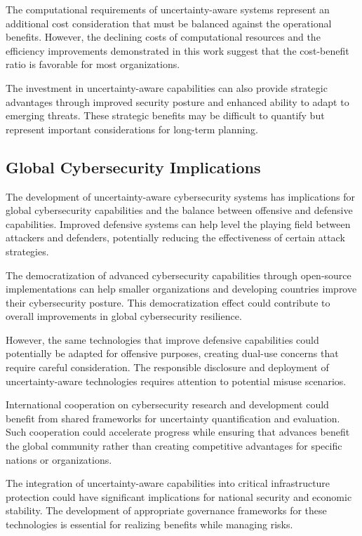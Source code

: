\documentclass[journal]{IEEEtran}
\begin{document}
The computational requirements of uncertainty-aware systems represent an additional cost consideration that must be balanced against the operational benefits. However, the declining costs of computational resources and the efficiency improvements demonstrated in this work suggest that the cost-benefit ratio is favorable for most organizations.

The investment in uncertainty-aware capabilities can also provide strategic advantages through improved security posture and enhanced ability to adapt to emerging threats. These strategic benefits may be difficult to quantify but represent important considerations for long-term planning.

\subsection{Global Cybersecurity Implications}

The development of uncertainty-aware cybersecurity systems has implications for global cybersecurity capabilities and the balance between offensive and defensive capabilities. Improved defensive systems can help level the playing field between attackers and defenders, potentially reducing the effectiveness of certain attack strategies.

The democratization of advanced cybersecurity capabilities through open-source implementations can help smaller organizations and developing countries improve their cybersecurity posture. This democratization effect could contribute to overall improvements in global cybersecurity resilience.

However, the same technologies that improve defensive capabilities could potentially be adapted for offensive purposes, creating dual-use concerns that require careful consideration. The responsible disclosure and deployment of uncertainty-aware technologies requires attention to potential misuse scenarios.

International cooperation on cybersecurity research and development could benefit from shared frameworks for uncertainty quantification and evaluation. Such cooperation could accelerate progress while ensuring that advances benefit the global community rather than creating competitive advantages for specific nations or organizations.

The integration of uncertainty-aware capabilities into critical infrastructure protection could have significant implications for national security and economic stability. The development of appropriate governance frameworks for these technologies is essential for realizing benefits while managing risks.
\end{document}

